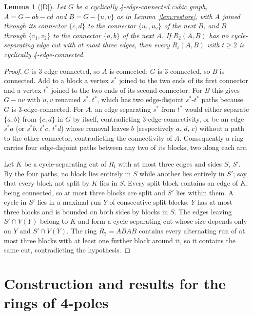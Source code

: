 \documentclass[11pt]{article}
\newtheorem{lemma}[theorem]{Lemma}
\theoremstyle{definition}
\theoremstyle{remark}
\newcommand{\claim}[1]{\textup{[#1]}}
\begin{document}
\begin{lemma}[\claim{D}]\label{lem:c4ec}
Let $G$ be a cyclically 4-edge-connected cubic graph, $A = G - ab - cd$ and $B = G - \{u, v\}$ as in
Lemma~\ref{lem:restore}, with $A$ joined through its connector $\{c, d\}$ to the connector $\{u_1,
u_2\}$ of the next $B$, and $B$ through $\{v_1, v_2\}$ to the connector $\{a, b\}$ of the next $A$.
If $R_2(A, B)$ has no cycle-separating edge cut with at most three edges, then every $R_t(A, B)$
with $t \ge 2$ is cyclically 4-edge-connected.
\end{lemma}

\begin{proof}
$G$ is 3-edge-connected, so $A$ is connected; $G$ is 3-connected, so $B$ is connected. Add to a
block a vertex $s^*$ joined to the two ends of its first connector and a vertex $t^*$ joined to
the two ends of its second connector. For $B$ this gives $G - uv$ with $u, v$ renamed $s^*, t^*$,
which has two edge-disjoint $s^*$-$t^*$ paths because $G$ is 3-edge-connected. For $A$, an edge
separating $s^*$ from $t^*$ would either separate $\{a, b\}$ from $\{c, d\}$ in $G$ by itself,
contradicting 3-edge-connectivity, or be an edge $s^*a$ (or $s^*b$, $t^*c$, $t^*d$) whose removal
leaves $b$ (respectively $a$, $d$, $c$) without a path to the other connector, contradicting the
connectivity of $A$. Consequently a ring carries four edge-disjoint paths between any two of its
blocks, two along each arc.

Let $K$ be a cycle-separating cut of $R_t$ with at most three edges and sides $S$, $S'$. By the
four paths, no block lies entirely in $S$ while another lies entirely in $S'$; say that every block
not split by $K$ lies in $S$. Every split block contains an edge of $K$, being connected, so at
most three blocks are split and $S'$ lies within them. A cycle in $S'$ lies in a maximal run $Y$ of
consecutive split blocks; $Y$ has at most three blocks and is bounded on both sides by blocks in
$S$. The edges leaving $S' \cap V(Y)$ belong to $K$ and form a cycle-separating cut whose size
depends only on $Y$ and $S' \cap V(Y)$. The ring $R_2 = ABAB$ contains every alternating run of at
most three blocks with at least one further block around it, so it contains the same cut,
contradicting the hypothesis.
\end{proof}

\section{Construction and results for the rings of 4-poles}\label{sec:construction}
\end{document}
